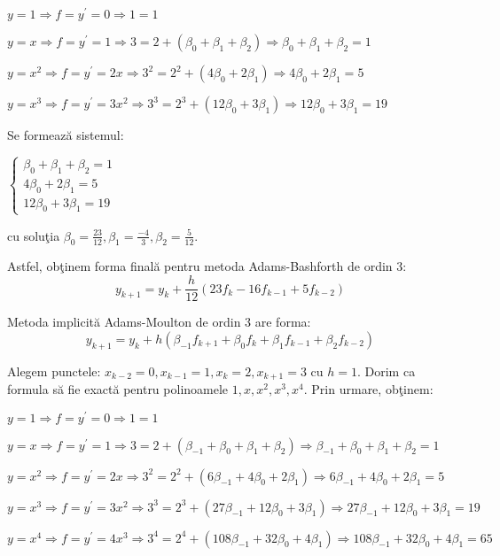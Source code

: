 \documentclass{exam}
\begin{document}
$y=1 \Rightarrow f = y^{'} =0 \Rightarrow 1 = 1 $

$y=x \Rightarrow f = y^{'} =1 \Rightarrow 3 = 2 + (\beta_{0}+\beta_{1}+\beta_{2}) \Rightarrow \beta_{0} + \beta_{1} + \beta_{2}= 1$

$y=x^2 \Rightarrow f = y^{'} =2x \Rightarrow 3^2 = 2^2 + (4\beta_{0}+2\beta_{1}) \Rightarrow 4\beta_{0}+2\beta_{1}= 5 $

$y=x^3 \Rightarrow f = y^{'} =3x^2 \Rightarrow 3^3 = 2^3 + (12\beta_{0}+3\beta_{1}) \Rightarrow 12\beta_{0}+3\beta_{1}= 19$

Se formează sistemul:
\begin{center}
	$\left\{
		\begin{array}{ll}
			\beta_{0} + \beta_{1} + \beta_{2}= 1 \\
			4\beta_{0}+2\beta_{1}= 5             \\
			12\beta_{0}+3\beta_{1}= 19
		\end{array}
		\right.$
\end{center}

\noindent cu soluţia $\beta_{0} = \frac{23}{12}, \beta_{1} = \frac{-4}{3},  \beta_{2} = \frac{5}{12}$.

Astfel, obţinem forma finală pentru metoda Adams-Bashforth de ordin 3:
$$y_{k+1}=y_{k}+\frac{h}{12}(23f_{k}-16f_{k-1}+5f_{k-2})$$

Metoda implicită Adams-Moulton de ordin 3 are forma:
$$y_{k+1}=y_{k}+h(\beta_{-1}f_{k+1}+\beta_{0}f_{k}+\beta_{1}f_{k-1}+\beta_{2}f_{k-2})$$

Alegem punctele: $x_{k-2}=0,x_{k-1}=1,x_{k}=2,x_{k+1}=3$ cu $h=1$. Dorim ca formula să fie exactă pentru polinoamele $1, x, x^2, x^3, x^4$. Prin urmare, obţinem:

$y=1 \Rightarrow f = y^{'} =0 \Rightarrow 1 = 1$

$y=x \Rightarrow f = y^{'} =1 \Rightarrow 3 = 2 + (\beta_{-1}+\beta_{0}+\beta_{1}+\beta_{2}) \Rightarrow \beta_{-1}+\beta_{0}+\beta_{1}+\beta_{2}= 1 $

$y=x^2 \Rightarrow f = y^{'} =2x \Rightarrow 3^2 = 2^2 + (6\beta_{-1}+4\beta_{0}+2\beta_{1}) \Rightarrow 6\beta_{-1}+4\beta_{0}+2\beta_{1}= 5$

$y=x^3 \Rightarrow f = y^{'} =3x^2 \Rightarrow 3^3 = 2^3 + (27\beta_{-1}+12\beta_{0}+3\beta_{1}) \Rightarrow 27\beta_{-1}+12\beta_{0}+3\beta_{1} = 19$

$y=x^4 \Rightarrow f = y^{'} =4x^3 \Rightarrow 3^4 = 2^4 + (108\beta_{-1}+32\beta_{0}+4\beta_{1}) \Rightarrow 108\beta_{-1}+32\beta_{0}+4\beta_{1}=65$
\end{document}
